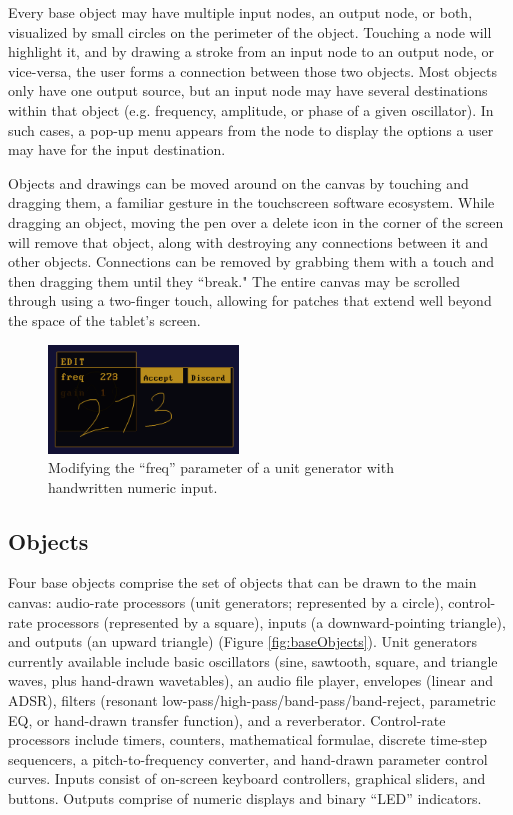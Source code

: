\documentclass{nime-alternate}
\begin{document}
Every base object may have multiple input nodes, an output node, or both, visualized by small circles on the perimeter of the object. 
Touching a node will highlight it, and by drawing a stroke from an input node to an output node, or vice-versa, the user forms a connection between those two objects. 
Most objects only have one output source, but an input node may have several destinations within that object (e.g. frequency, amplitude, or phase of a given oscillator). 
In such cases, a pop-up menu appears from the node to display the options a user may have for the input destination. 

Objects and drawings can be moved around on the canvas by touching and dragging them, a familiar gesture in the touchscreen software ecosystem. 
While dragging an object, moving the pen over a delete icon in the corner of the screen will remove that object, along with destroying any connections between it and other objects. 
Connections can be removed by grabbing them with a touch and then dragging them until they ``break."
The entire canvas may be scrolled through using a two-finger touch, allowing for patches that extend well beyond the space of the tablet's screen. 

\begin{figure}[h]
	\centering
		\includegraphics[width=0.45\textwidth]{figures/editor.png}
	\caption{Modifying the ``freq'' parameter of a unit generator with handwritten numeric input.}
	\label{fig:editor}
\end{figure}

\subsection{Objects}
\label{sec:BaseGlyphs}

Four base objects comprise the set of objects that can be drawn to the main canvas: audio-rate processors (unit generators; represented by a circle), control-rate processors (represented by a square), inputs (a downward-pointing triangle), and outputs (an upward triangle) (Figure \ref{fig:baseObjects}). 
Unit generators currently available include basic oscillators (sine, sawtooth, square, and triangle waves, plus hand-drawn wavetables), an audio file player, envelopes (linear and ADSR), filters (resonant low-pass/high-pass/band-pass/band-reject, parametric EQ, or hand-drawn transfer function), and a reverberator. 
Control-rate processors include timers, counters, mathematical formulae, discrete time-step sequencers, a pitch-to-frequency converter, and hand-drawn parameter control curves. 
Inputs consist of on-screen keyboard controllers, graphical sliders, and buttons. 
Outputs comprise of numeric displays and binary ``LED'' indicators.  
\end{document}
